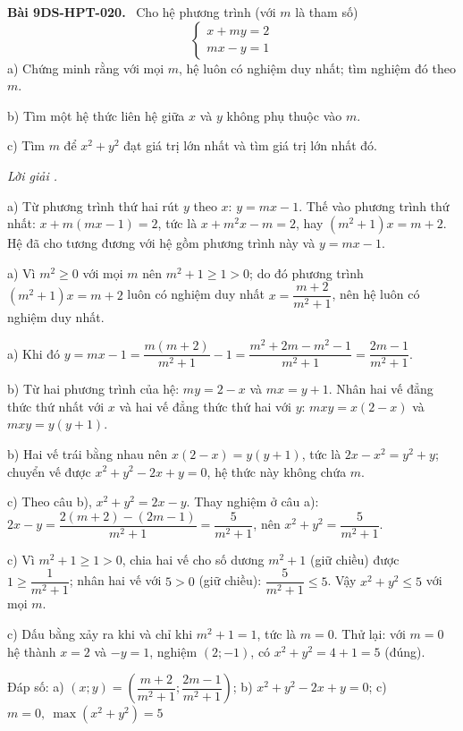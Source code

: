 \documentclass[12pt,a4paper]{article}
\newenvironment{problem}[1][]{\par\medskip\noindent\textbf{Bài #1.}\ }{\par}
\newenvironment{solution}[1][]{\par\noindent\textit{Lời giải #1.}\par}{\par}
\begin{document}
\begin{problem}[9DS-HPT-020]
Cho hệ phương trình (với $m$ là tham số)
\[ \begin{cases} x + my = 2 \\ mx - y = 1 \end{cases} \]
a) Chứng minh rằng với mọi $m$, hệ luôn có nghiệm duy nhất; tìm nghiệm đó theo $m$.

b) Tìm một hệ thức liên hệ giữa $x$ và $y$ không phụ thuộc vào $m$.

c) Tìm $m$ để $x^2 + y^2$ đạt giá trị lớn nhất và tìm giá trị lớn nhất đó.

\begin{solution}
a) Từ phương trình thứ hai rút $y$ theo $x$: $y = mx - 1$. Thế vào phương trình thứ nhất: $x + m(mx - 1) = 2$, tức là $x + m^2x - m = 2$, hay $(m^2 + 1)x = m + 2$. Hệ đã cho tương đương với hệ gồm phương trình này và $y = mx - 1$.

a) Vì $m^2 \geq 0$ với mọi $m$ nên $m^2 + 1 \geq 1 > 0$; do đó phương trình $(m^2 + 1)x = m + 2$ luôn có nghiệm duy nhất $x = \dfrac{m + 2}{m^2 + 1}$, nên hệ luôn có nghiệm duy nhất.

a) Khi đó $y = mx - 1 = \dfrac{m(m + 2)}{m^2 + 1} - 1 = \dfrac{m^2 + 2m - m^2 - 1}{m^2 + 1} = \dfrac{2m - 1}{m^2 + 1}$.

b) Từ hai phương trình của hệ: $my = 2 - x$ và $mx = y + 1$. Nhân hai vế đẳng thức thứ nhất với $x$ và hai vế đẳng thức thứ hai với $y$: $mxy = x(2 - x)$ và $mxy = y(y + 1)$.

b) Hai vế trái bằng nhau nên $x(2 - x) = y(y + 1)$, tức là $2x - x^2 = y^2 + y$; chuyển vế được $x^2 + y^2 - 2x + y = 0$, hệ thức này không chứa $m$.

c) Theo câu b), $x^2 + y^2 = 2x - y$. Thay nghiệm ở câu a): $2x - y = \dfrac{2(m + 2) - (2m - 1)}{m^2 + 1} = \dfrac{5}{m^2 + 1}$, nên $x^2 + y^2 = \dfrac{5}{m^2 + 1}$.

c) Vì $m^2 + 1 \geq 1 > 0$, chia hai vế cho số dương $m^2 + 1$ (giữ chiều) được $1 \geq \dfrac{1}{m^2 + 1}$; nhân hai vế với $5 > 0$ (giữ chiều): $\dfrac{5}{m^2 + 1} \leq 5$. Vậy $x^2 + y^2 \leq 5$ với mọi $m$.

c) Dấu bằng xảy ra khi và chỉ khi $m^2 + 1 = 1$, tức là $m = 0$. Thử lại: với $m = 0$ hệ thành $x = 2$ và $-y = 1$, nghiệm $(2; -1)$, có $x^2 + y^2 = 4 + 1 = 5$ (đúng).

Đáp số: a) $\boxed{(x; y) = \left(\dfrac{m + 2}{m^2 + 1}; \dfrac{2m - 1}{m^2 + 1}\right)}$; b) $\boxed{x^2 + y^2 - 2x + y = 0}$; c) $\boxed{m = 0,\ \max(x^2 + y^2) = 5}$
\end{solution}
\end{problem}
\end{document}
